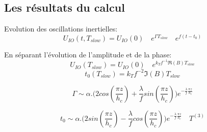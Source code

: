 \documentclass{beamer}
\begin{document}
\subsection{Les résultats du calcul}
\frame
{
\color{black}
Evolution des oscillations inertielles:
$$U_{IO}(t,T_{slow}) = U_{IO}(0) \quad e^{\Gamma T_{slow}} \quad e^{f(t-t_0)}$$
\begin{overprint}
En séparant l'évolution de l'amplitude et de la phase:
$$
U_{IO}(T_{slow}) = U_{IO}(0) \quad e^{k_T f^{-1} \Re (B) T_{slow}}
$$
$$
t_0(T_{slow}) = k_T f^{-2} \Im (B) T_{slow}
$$



$$\Gamma \sim \alpha . \big( 2 cos(\frac{\pi z}{h_c}) + \frac{\lambda}{f}sin(\frac{\pi z}{h_c})  \big)e^{-\frac{\lambda}{f} \frac{\pi z}{h_c}}$$

$$t_0    \sim \alpha . \big( 2 sin(\frac{\pi z}{h_c}) - \frac{\lambda}{f}cos(\frac{\pi z}{h_c})  \big)e^{-\frac{\lambda}{f} \frac{\pi z}{h_c}} \quad T^{(3)}$$
\end{overprint}

\uncover<3->{

\begin{center}
\begin{minipage}{50mm}
      \begin{alertblock}{}
            \begin{center}
                  \color{green}{$h_c = \frac{\pi c_g^z(IW)}{f} \sim \frac{\pi U_G^2 k_T}{N f}$}
                  $\quad$
                  \color{blue}{$\alpha =  1 + 4 \frac {f^2}{U_G^2 k_T^2} - 6 \frac{\lambda^2}{U_G^2 k_T^2}$}

            \end{center}
      \end{alertblock}
\end{minipage}
\end{center}
}
}
\frame
\end{document}
